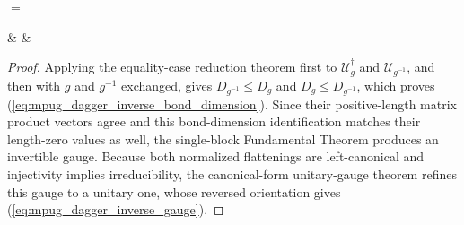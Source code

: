 \begin{center}
    \tenkzkernel
    \begin{tenkz}[rows={wire}, cols=1, west=open, east=open]
    \end{tenkz}
    \quad $=$ \quad
    \begin{tenkz}[rows={wire}, cols=3, west=open, east=open]
         &
         &
    \end{tenkz}
\end{center}

\begin{proof}\leanok
    Applying the equality-case reduction theorem first to
    $\mathcal U_g^\dagger$ and $\mathcal U_{g^{-1}}$, and then with $g$ and
    $g^{-1}$ exchanged, gives $D_{g^{-1}}\leq D_g$ and $D_g\leq D_{g^{-1}}$,
    which proves (\ref{eq:mpug_dagger_inverse_bond_dimension}). Since their
    positive-length matrix product vectors agree and this bond-dimension
    identification matches their length-zero values as well, the single-block
    Fundamental Theorem produces an invertible gauge. Because both normalized
    flattenings are left-canonical and injectivity implies irreducibility, the
    canonical-form unitary-gauge theorem refines this gauge to a unitary one,
    whose reversed orientation gives (\ref{eq:mpug_dagger_inverse_gauge}).
\end{proof}

